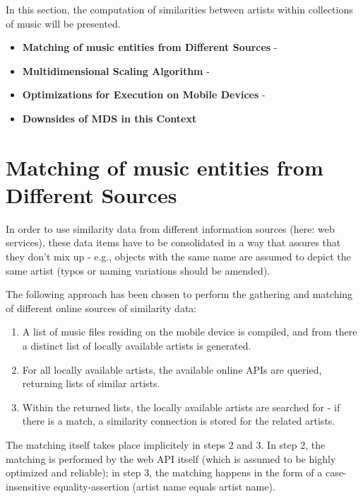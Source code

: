 In this section, the computation of similarities between artists within collections of music
will be presented.

\begin{itemize}
	\item \textbf {Matching of music entities from Different Sources} - 
	\item \textbf {Multidimensional Scaling Algorithm} - 
	\item \textbf {Optimizations for Execution on Mobile Devices} - 
	\item \textbf {Downsides of MDS in this Context}
\end{itemize}

\section{Matching of music entities from Different Sources}

In order to use similarity data from different information sources (here: web services), these
data items have to be consolidated in a way that assures that they don't mix up - e.g., objects with
the same name are assumed to depict the same artist (typos or naming variations should be amended).

The following approach has been chosen to perform the gathering and matching of different online sources of 
similarity data:

\begin{enumerate}
	\item A list of music files residing on the mobile device is compiled, and from there a distinct list of 
locally available artists is generated.
	\item For all locally available artists, the available online APIs are queried, returning lists of similar artists.
	\item Within the returned lists, the locally available artists are searched for - if there is a match, a
similarity connection is stored for the related artists.
\end{enumerate}

The matching itself takes place implicitely in steps 2 and 3. In step 2, the matching is performed by the web API
itself (which is assumed to be highly optimized and reliable); in step 3, the matching happens in the form of a
case-insensitive equality-assertion (artist name equals artist name). 

